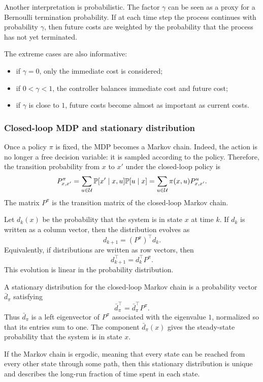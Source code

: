 Another interpretation is probabilistic. The factor \(\gamma\) can be seen as a proxy for a
Bernoulli termination probability. If at each time step the process continues with probability
\(\gamma\), then future costs are weighted by the probability that the process has not yet
terminated.

The extreme cases are also informative:
\begin{itemize}
    \item if \(\gamma=0\), only the immediate cost is considered;
    \item if \(0<\gamma<1\), the controller balances immediate cost and future cost;
    \item if \(\gamma\) is close to \(1\), future costs become almost as important as current costs.
\end{itemize}

\subsubsection{Closed-loop MDP and stationary distribution}

Once a policy \(\pi\) is fixed, the MDP becomes a Markov chain. Indeed, the action is no longer
a free decision variable: it is sampled according to the policy. Therefore, the transition
probability from \(x\) to \(x'\) under the closed-loop policy is
\[
P^\pi_{x,x'}
=
\sum_{u\in\mathcal{U}}
\mathbb{P}[x'\mid x,u]\mathbb{P}[u\mid x]
=
\sum_{u\in\mathcal{U}}
\pi(x,u)P^u_{x,x'}.
\]
The matrix \(P^\pi\) is the transition matrix of the closed-loop Markov chain.

Let \(d_k(x)\) be the probability that the system is in state \(x\) at time \(k\). If \(d_k\) is
written as a column vector, then the distribution evolves as
\[
d_{k+1}
=
(P^\pi)^\top d_k.
\]
Equivalently, if distributions are written as row vectors, then
\[
d_{k+1}^\top
=
d_k^\top P^\pi.
\]
This evolution is linear in the probability distribution.

A stationary distribution for the closed-loop Markov chain is a probability vector
\(\bar d_\pi\) satisfying
\[
\bar d_\pi^\top
=
\bar d_\pi^\top P^\pi.
\]
Thus \(\bar d_\pi\) is a left eigenvector of \(P^\pi\) associated with the eigenvalue \(1\),
normalized so that its entries sum to one. The component \(\bar d_\pi(x)\) gives the steady-state
probability that the system is in state \(x\).

If the Markov chain is ergodic, meaning that every state can be reached from every other state
through some path, then this stationary distribution is unique and describes the long-run
fraction of time spent in each state.

